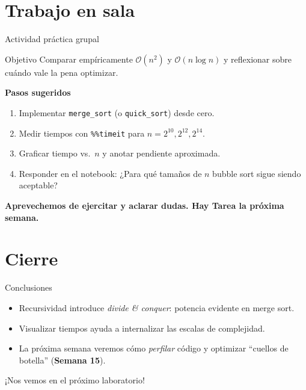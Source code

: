 \documentclass[10pt]{beamer}
\begin{document}
\section{Trabajo en sala}
\begin{frame}[fragile]{Actividad práctica grupal}
\begin{block}{Objetivo}
Comparar empíricamente \(\mathcal{O}(n^{2})\) y \(\mathcal{O}(n\log n)\) 
y reflexionar sobre cuándo vale la pena optimizar.
\end{block}

\textbf{Pasos sugeridos}
\begin{enumerate}
  \item Implementar \texttt{merge\_sort} (o \texttt{quick\_sort}) desde cero.
  \item Medir tiempos con \texttt{\%\%timeit} para $n=2^{10},2^{12},2^{14}$.
  \item Graficar tiempo vs.~$n$ y anotar pendiente aproximada.
  \item Responder en el notebook:  
  ¿Para qué tamaños de $n$ bubble sort sigue siendo aceptable?
\end{enumerate}

\textbf{Aprevechemos de ejercitar y aclarar dudas. Hay Tarea la próxima semana.}
\end{frame}

\section{Cierre}
\begin{frame}[fragile]{Conclusiones}
\begin{itemize}
  \item Recursividad introduce \emph{divide \& conquer}: potencia
        evidente en merge sort.  
  \item Visualizar tiempos ayuda a internalizar las escalas de
        complejidad.  
  \item La próxima semana veremos cómo \emph{perfilar} código y
        optimizar “cuellos de botella” (\textbf{Semana 15}).  
\end{itemize}
\centering
\Large ¡Nos vemos en el próximo laboratorio!
\end{frame}
\end{document}
